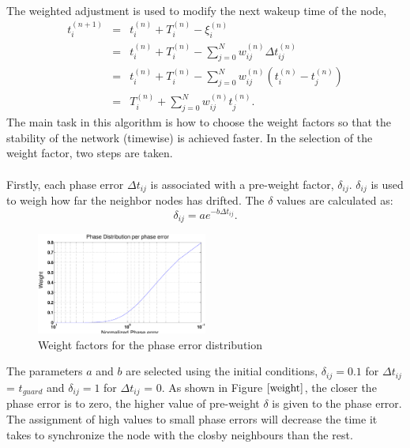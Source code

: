 \documentclass[a4paper,10pt]{report}
\begin{document}
\paragraph*{}
The weighted adjustment is used to modify the next wakeup time of the node,
\begin{eqnarray*}
t_i^{(n+1)} &=& t_i^{(n)} + T_i^{(n)} - \xi_i^{(n)} \\ &=& t_i^{(n)}
+ T_i^{(n)} - \sum_{j=0}^N{w_{ij}^{(n)}\Delta t_{ij}^{(n)}} \\ &=&
t_i^{(n)}+ T_i^{(n)} -
\sum_{j=0}^N{w_{ij}^{(n)}(t_i^{(n)}-t_j^{(n)})} \\ &=& T_i^{(n)} + \sum_{j=0}^N{w_{ij}^{(n)}t_j^{(n)}}.
\end{eqnarray*}
The main task in this algorithm is how to choose the weight factors so that the stability of the network (timewise) is achieved faster. In the selection of the weight factor, two steps are taken. \paragraph*{} \noindent 
Firstly, each phase error $\Delta t_{ij}$ is associated with a pre-weight factor, $\delta_{ij}$. $\delta_{ij}$ is used to weigh how far the neighbor nodes has drifted. The $\delta$ values are calculated as:
\begin{equation}
\delta_{ij} = ae^{-b\Delta t_{ij}}.
\end{equation}
\begin{figure}[t]
\centering
\includegraphics[width= 0.5\textwidth]{weight}
\caption{Weight factors for the phase error distribution}
\label{weight}
\end{figure}
The parameters $a$ and $b$ are selected using the initial conditions, $\delta_{ij}=0.1$ for $\Delta t_{ij}$ = $t_{guard}$ and $\delta_{ij}=1$ for $\Delta t_{ij}$ = 0. As shown in Figure $\ref{weight}$, the closer the phase error is to zero, the higher value of pre-weight $\delta$ is given to the phase error. The assignment of high values to small phase errors will decrease the time it takes to synchronize the node with the closby neighbours than the rest.
\end{document}
